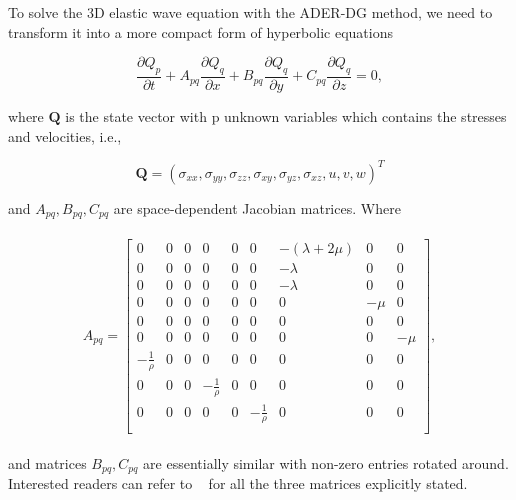 To solve the 3D elastic wave equation with the \ac{ADER}-\ac{DG} method, we need to transform it into a more compact form of hyperbolic equations

\begin{equation}
    \frac{\partial Q_p}{\partial t} + A_{pq} \frac{\partial Q_q}{\partial x} + 
    B_{pq} \frac{\partial Q_q}{\partial y} + C_{pq} \frac{\partial Q_q}{\partial z} = 0,
    \label{eq:compactform}
\end{equation}

where $\mathbf{Q}$ is the state vector with p unknown variables which contains the stresses and velocities, i.e.,

\begin{equation}
    \mathbf{Q} = \left(\sigma_{xx}, \sigma_{yy}, \sigma_{zz}, \sigma_{xy}, \sigma_{yz}, \sigma_{xz}, u, v, w \right)^T
\end{equation}

and $A_{pq}, B_{pq}, C_{pq}$ are space-dependent Jacobian matrices. Where

\begin{align}
    \begin{split}
    A_{pq} = 
        \begin{bmatrix}
        0 & 0 & 0 & 0 & 0 & 0 & -\left(\lambda + 2\mu\right) & 0 & 0 \\
        0 & 0 & 0 & 0 & 0 & 0 & -\lambda                     & 0 & 0 \\
        0 & 0 & 0 & 0 & 0 & 0 & -\lambda                     & 0 & 0 \\
        0 & 0 & 0 & 0 & 0 & 0 & 0                   & -\mu & 0 \\
        0 & 0 & 0 & 0 & 0 & 0 & 0                   & 0 & 0 \\
        0 & 0 & 0 & 0 & 0 & 0 & 0                   & 0 & -\mu \\
        -\frac{1}{\rho} & 0 & 0 & 0 & 0 & 0 & 0                   & 0 & 0 \\
        0 & 0 & 0 & -\frac{1}{\rho} & 0 & 0 & 0                   & 0 & 0 \\
        0 & 0 & 0 & 0 & 0 & -\frac{1}{\rho} & 0                   & 0 & 0 \\
    \end{bmatrix},
    \end{split}
    \label{eq:fluxmatrix}
\end{align}

and matrices $B_{pq}, C_{pq}$ are essentially similar with non-zero entries rotated around. Interested readers can refer to
~\parencite{dumbser1} for all the three matrices explicitly stated. \\

